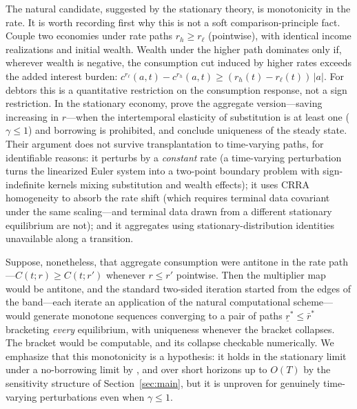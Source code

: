 \documentclass[11pt]{article}
\theoremstyle{definition}
\theoremstyle{remark}
\newcommand{\ubar}[1]{\underline{#1}}
\begin{document}
The natural candidate, suggested by the stationary theory, is
monotonicity in the rate. It is worth recording first why this is not
a soft comparison-principle fact. Couple two economies under rate
paths $r_h\ge r_\ell$ (pointwise), with identical income realizations
and initial wealth. Wealth under the higher path dominates only if,
wherever wealth is negative, the consumption cut induced by higher
rates exceeds the added interest burden:
$c^{r_\ell}(a,t)-c^{r_h}(a,t)\ge(r_h(t)-r_\ell(t))\,|a|$. For
debtors this is a quantitative restriction on the consumption
response, not a sign restriction. In the stationary economy,
\citet{AHLLM2022} prove the aggregate version---saving increasing in
$r$---when the intertemporal elasticity of substitution is at least
one ($\gamma\le1$) and borrowing is prohibited, and conclude
uniqueness of the steady state. Their argument does not survive
transplantation to time-varying paths, for identifiable reasons: it
perturbs by a \emph{constant} rate (a time-varying perturbation turns
the linearized Euler system into a two-point boundary problem with
sign-indefinite kernels mixing substitution and wealth effects); it
uses CRRA homogeneity to absorb the rate shift (which requires
terminal data covariant under the same scaling---and terminal data
drawn from a different stationary equilibrium are not); and it
aggregates using stationary-distribution identities unavailable along
a transition.

Suppose, nonetheless, that aggregate consumption were antitone in the
rate path---$C(t;r)\ge C(t;r')$ whenever $r\le r'$ pointwise. Then
the multiplier map would be antitone, and the standard two-sided
iteration started from the edges of the band---each iterate an
application of the natural computational scheme---would generate
monotone sequences converging to a pair of paths
$\ubar r^\ast\le\bar r^\ast$ bracketing \emph{every} equilibrium,
with uniqueness whenever the bracket collapses. The bracket would be
computable, and its collapse checkable numerically. We emphasize that
this monotonicity is a hypothesis: it holds in the stationary limit
under a no-borrowing limit by \citet{AHLLM2022}, and over short
horizons up to $O(T)$ by the sensitivity structure of
Section~\ref{sec:main}, but it is unproven for genuinely time-varying
perturbations even when $\gamma\le1$.
\end{document}
